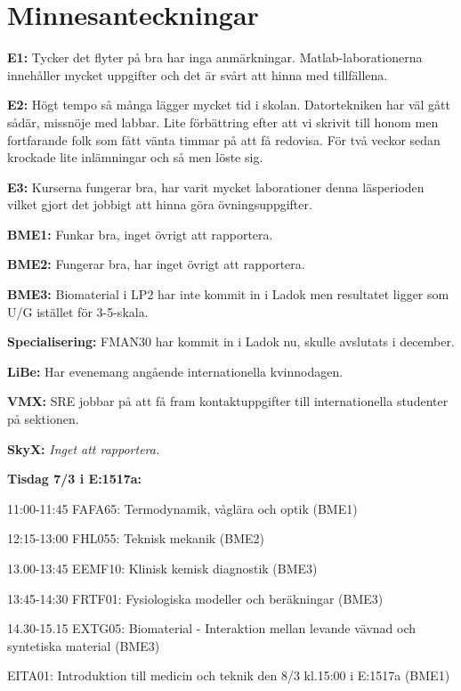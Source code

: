 \documentclass[10pt]{article}
\begin{document}
\section*{Minnesanteckningar}
\begin{paragrafer}
\textbf{E1:} Tycker det flyter på bra har inga anmärkningar. Matlab-laborationerna innehåller mycket uppgifter och det är svårt att hinna med tillfällena.  

\textbf{E2:} Högt tempo så många lägger mycket tid i skolan. Datortekniken har väl gått sådär, missnöje med labbar. Lite förbättring efter att vi skrivit till honom men fortfarande folk som fått vänta timmar på att få redovisa. För två veckor sedan krockade lite inlämningar och så men löste sig.

\textbf{E3:} Kurserna fungerar bra, har varit mycket laborationer denna läsperioden vilket gjort det jobbigt att hinna göra övningsuppgifter. 

\textbf{BME1:} Funkar bra, inget övrigt att rapportera. 

\textbf{BME2:} Fungerar bra, har inget övrigt att rapportera. 

\textbf{BME3:} Biomaterial i LP2 har inte kommit in i Ladok men resultatet ligger som U/G istället för 3-5-skala.

\textbf{Specialisering:} FMAN30 har kommit in i Ladok nu, skulle avslutats i december. 

\textbf{LiBe:} %
Har evenemang angående internationella kvinnodagen.

\textbf{VMX:} %
SRE jobbar på att få fram kontaktuppgifter till internationella studenter på sektionen.

\textbf{SkyX:} \textit{Inget att rapportera.}


\textbf{Tisdag 7/3 i E:1517a:}
\item 11:00-11:45 FAFA65: Termodynamik, våglära och optik (BME1)
\item 12:15-13:00 FHL055: Teknisk mekanik (BME2)
\item 13.00-13:45 EEMF10: Klinisk kemisk diagnostik (BME3)
\item 13:45-14:30 FRTF01:  Fysiologiska modeller och beräkningar (BME3)
\item 14.30-15.15 EXTG05: Biomaterial - Interaktion mellan levande vävnad och syntetiska material  (BME3)

EITA01: Introduktion till medicin och teknik den 8/3 kl.15:00 i E:1517a (BME1)


\end{paragrafer}
\end{document}

